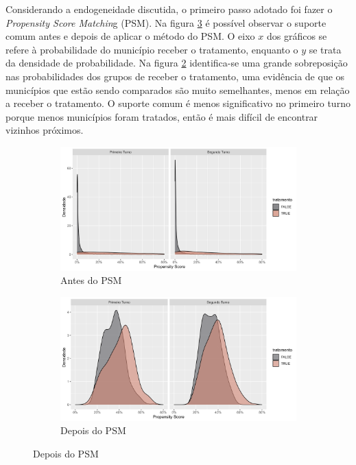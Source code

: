 Considerando a endogeneidade discutida, o primeiro passo adotado foi fazer o \textit{Propensity Score Matchin}g (PSM). Na figura \ref{fig_balanceamento} é possível observar o suporte comum antes e depois de aplicar o método do PSM. O eixo $x$ dos gráficos se refere à probabilidade do município receber o tratamento, enquanto o $y$ se trata da densidade de probabilidade. Na figura \ref{fig_posPSM} identifica-se uma grande sobreposição nas probabilidades dos grupos de receber o tratamento, uma evidência de que os municípios que estão sendo comparados são muito semelhantes, menos em relação a receber o tratamento. O suporte comum é menos significativo no primeiro turno porque menos municípios foram tratados, então é mais difícil de encontrar vizinhos próximos.

\begin{figure}[!ht]
  \caption{Balanceamento dos grupos antes e depois do \textit{Propensity Score Matching} (PSM)}
    \begin{subfigure}[t]{0.49\linewidth}
      \includegraphics[width = \linewidth]{relatorios/passe-livre/graficos/pre-propensity.png}
      \caption{Antes do PSM}
      \label{fig_prePSM}
    \end{subfigure}
    \hfill
    \begin{subfigure}[t]{0.49\linewidth}
      \includegraphics[width = \linewidth]{relatorios/passe-livre/graficos/pos-propensity.png}
      \caption{Depois do PSM}
      \label{fig_posPSM}
    \end{subfigure}
    \label{fig_balanceamento}
  \end{figure}

